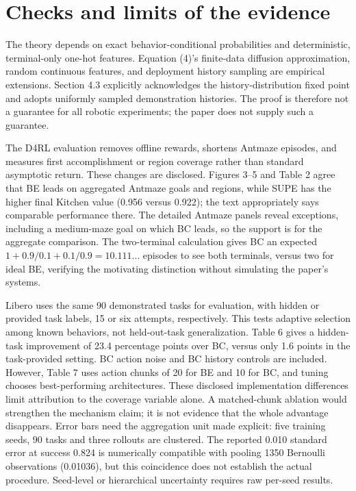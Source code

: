 \documentclass[10pt]{article}
\begin{document}
\section*{Checks and limits of the evidence}
The theory depends on exact behavior-conditional probabilities and deterministic, terminal-only one-hot features. Equation (4)’s finite-data diffusion approximation, random continuous features, and deployment history sampling are empirical extensions. Section 4.3 explicitly acknowledges the history-distribution fixed point and adopts uniformly sampled demonstration histories. The proof is therefore not a guarantee for all robotic experiments; the paper does not supply such a guarantee.\par
The D4RL evaluation removes offline rewards, shortens Antmaze episodes, and measures first accomplishment or region coverage rather than standard asymptotic return. These changes are disclosed. Figures 3–5 and Table 2 agree that BE leads on aggregated Antmaze goals and regions, while SUPE has the higher final Kitchen value (0.956 versus 0.922); the text appropriately says comparable performance there. The detailed Antmaze panels reveal exceptions, including a medium-maze goal on which BC leads, so the support is for the aggregate comparison. The two-terminal calculation gives BC an expected \(1+0.9/0.1+0.1/0.9=10.111\ldots\) episodes to see both terminals, versus two for ideal BE, verifying the motivating distinction without simulating the paper’s systems.\par
Libero uses the same 90 demonstrated tasks for evaluation, with hidden or provided task labels, 15 or six attempts, respectively. This tests adaptive selection among known behaviors, not held-out-task generalization. Table 6 gives a hidden-task improvement of 23.4 percentage points over BC, versus only 1.6 points in the task-provided setting. BC action noise and BC history controls are included. However, Table 7 uses action chunks of 20 for BE and 10 for BC, and tuning chooses best-performing architectures. These disclosed implementation differences limit attribution to the coverage variable alone. A matched-chunk ablation would strengthen the mechanism claim; it is not evidence that the whole advantage disappears. Error bars need the aggregation unit made explicit: five training seeds, 90 tasks and three rollouts are clustered. The reported 0.010 standard error at success 0.824 is numerically compatible with pooling 1350 Bernoulli observations (0.01036), but this coincidence does not establish the actual procedure. Seed-level or hierarchical uncertainty requires raw per-seed results.\par
\end{document}
